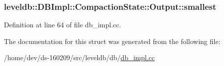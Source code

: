 \subsubsection[{smallest}]{ leveldb\+::\+D\+B\+Impl\+::\+Compaction\+State\+::\+Output\+::smallest}\label{structleveldb_1_1_d_b_impl_1_1_compaction_state_1_1_output_a88ada857d0cf32ae8e76d7baf4e80c69}


Definition at line 64 of file db\+\_\+impl.\+cc.



The documentation for this struct was generated from the following file\+:\begin{DoxyCompactItemize}
\item 
/home/dev/ds-\/160209/src/leveldb/db/\hyperlink{db__impl_8cc}{db\+\_\+impl.\+cc}\end{DoxyCompactItemize}
